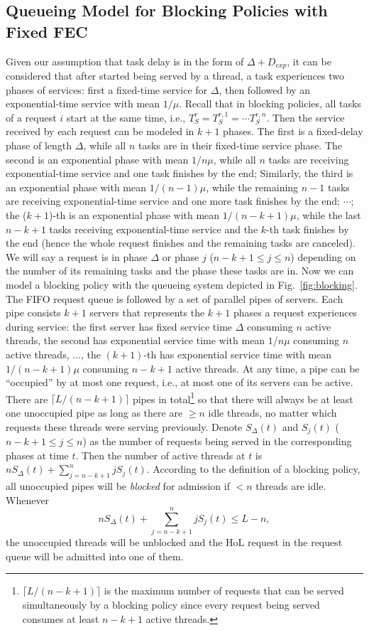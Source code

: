 \documentclass[journal]{IEEEtran}
\begin{document}
\subsection{Queueing Model for Blocking Policies with Fixed FEC}
Given our assumption that task delay is in the form of $\Delta + D_{exp}$, it can be considered that after started being served by a thread, a task experiences two phases of services: first a fixed-time service for $\Delta$, then followed by an exponential-time service with mean $1/\mu$. Recall that in blocking policies, all tasks of a request $i$ start at the same time, i.e., $T_S^{r} = T_S^{r,1}=\cdots T_S^{r,n}$. 
Then the service received by each request can be modeled in $k+1$ phases. The first is a fixed-delay phase of length $\Delta$, while all $n$ tasks are in their fixed-time service phase. The second is an exponential phase with mean $1/n\mu$, while all $n$ tasks are receiving exponential-time service and one task finishes by the end; Similarly, the third is an exponential phase with mean $1/(n-1)\mu$, while the remaining $n-1$ tasks are receiving exponential-time service and one more task finishes by the end; $\cdots$; the ($k+1$)-th is an exponential phase with mean $1/(n-k+1)\mu$, while the last $n-k+1$ tasks receiving exponential-time service and the $k$-th task finishes by the end (hence the whole request finishes and the remaining tasks are canceled). We will say a request is in phase $\Delta$ or phase $j$ ($n-k+1\le j \le n$) depending on the number of its remaining tasks and the phase these tasks are in. 
Now we can model a blocking policy with the queueing system depicted in Fig.~\ref{fig:blocking}. 
The FIFO request queue is followed by a set of parallel pipes of servers. Each pipe consists $k+1$ servers that represents the $k+1$ phases a request experiences during service: the first server has fixed service time $\Delta$ consuming $n$ active threads, the second has exponential service time with mean $1/n\mu$ consuming $n$ active threads, ..., the $(k+1)$-th has exponential service time with mean $1/(n-k+1)\mu$ consuming $n-k+1$ active threads. At any time, a pipe can be ``occupied'' by at most one request, i.e., at most one of its servers can be active. There are $\lceil L/(n-k+1)\rceil$ pipes in total\footnote{$\lceil L/(n-k+1)\rceil$ is the maximum number of requests that can be served simultaneously by a blocking policy since every request being served consumes at least $n-k+1$ active threads.} so that there will always be at least one unoccupied pipe as long as there are $\ge n$ idle threads, no matter which requests these threads were serving previously. 
Denote $S_{\Delta}(t)$ and $S_j(t)$  ($n-k+1\le j \le n$) as the number of requests being served in the corresponding phases at time $t$. Then the number of active threads at $t$ is $nS_{\Delta}(t) + \sum_{j=n-k+1}^n jS_j(t)$.
According to the definition of a blocking policy, all unoccupied pipes will be {\em blocked} for admission if $<n$ threads are idle. Whenever  
$$
nS_{\Delta}(t) + \sum_{j=n-k+1}^n jS_j(t) \le L-n,
$$
the unoccupied threads will be unblocked and the HoL request in the request queue will be admitted into one of them.
\end{document}
